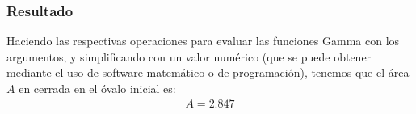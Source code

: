 \begin{frame}
\frametitle{Resultado}
Haciendo las respectivas operaciones para evaluar las funciones Gamma con los argumentos, y simplificando con un valor numérico (que se puede obtener mediante el uso de software matemático o de programación), tenemos que el área $A$ en cerrada en el óvalo inicial es:
\pause
\begin{align*}
A = 2.847
\end{align*}
\end{frame}

